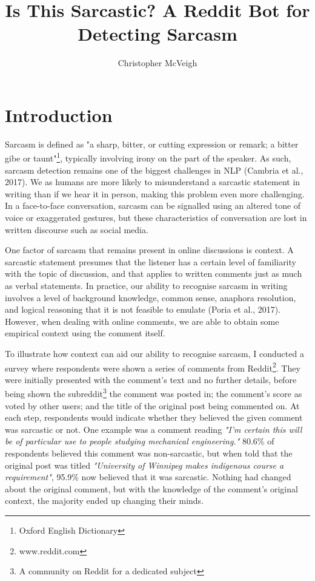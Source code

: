 \documentclass[a4paper,12pt]{article}
\title{Is This Sarcastic? A Reddit Bot for Detecting Sarcasm}
\author{Christopher McVeigh}
\let\stdsection\section
\renewcommand\section{\newpage\stdsection}
\begin{document}


\thispagestyle{empty}
\clearpage
\tableofcontents
\thispagestyle{empty}
\clearpage
\setcounter{page}{1}


\section{Introduction}
Sarcasm is defined as "a sharp, bitter, or cutting expression or remark; a bitter gibe or taunt"\footnote{Oxford English Dictionary}, typically involving irony on the part of the speaker. As such, sarcasm detection remains one of the biggest challenges in NLP (Cambria et al., 2017). We as humans are more likely to misunderstand a sarcastic statement in writing than if we hear it in person, making this problem even more challenging. In a face-to-face conversation, sarcasm can be signalled using an altered tone of voice or exaggerated gestures, but these characteristics of conversation are lost in written discourse such as social media.

One factor of sarcasm that remains present in online discussions is context. A sarcastic statement presumes that the listener has a certain level of familiarity with the topic of discussion, and that applies to written comments just as much as verbal statements. In practice, our ability to recognise sarcasm in writing involves a level of background knowledge, common sense, anaphora resolution, and logical reasoning that it is not feasible to emulate (Poria et al., 2017). However, when dealing with online comments, we are able to obtain some empirical context using the comment itself.

To illustrate how context can aid our ability to recognise sarcasm, I conducted a survey where respondents were shown a series of comments from Reddit\footnote{www.reddit.com}. They were initially presented with the comment's text and no further details, before being shown the subreddit\footnote{A community on Reddit for a dedicated subject} the comment was posted in; the comment's score as voted by other users; and the title of the original post being commented on. At each step, respondents would indicate whether they believed the given comment was sarcastic or not. One example was a comment reading \textit{"I'm certain this will be of particular use to people studying mechanical engineering."} 80.6\% of respondents believed this comment was non-sarcastic, but when told that the original post was titled \textit{"University of Winnipeg makes indigenous course a requirement"}, 95.9\% now believed that it was sarcastic. Nothing had changed about the original comment, but with the knowledge of the comment's original context, the majority ended up changing their minds.
\end{document}
